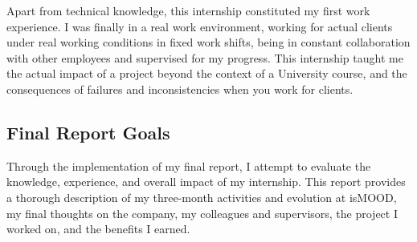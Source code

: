 Apart from technical knowledge,
this internship constituted my first work experience.
I was finally in a real work environment,
working for actual clients
under real working conditions
in fixed work shifts,
being in constant collaboration with other employees
and supervised for my progress.
This internship taught me the actual impact of a project
beyond the context of a University course,
and the consequences of failures and inconsistencies
when you work for clients.

\subsection{Final Report Goals}
\label{subsec:report-goals}

Through the implementation of my final report,
I attempt to evaluate the knowledge, experience,
and overall impact of my internship.
This report provides a thorough description
of my three-month activities and evolution at isMOOD,
my final thoughts on the company,
my colleagues and supervisors,
the project I worked on, and
the benefits I earned.
